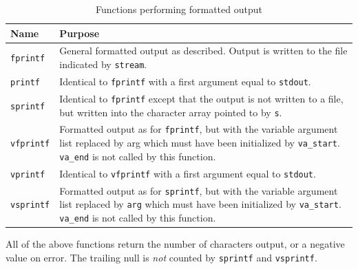 \begin{table}[htb]
  \centering
  \begin{tabular}{lp{}}%
    \toprule
    Name & Purpose    \\
    \midrule

    \texttt{fprintf} & General formatted output  as  described.
                       Output  is written to the file indicated
                       by \texttt{stream}.    \\

    \texttt{printf} & Identical  to  \texttt{fprintf}  with   a   first
                      argument equal to \texttt{stdout}.
    \\
    
    \texttt{sprintf} & Identical to  \texttt{fprintf}  except  that  the
                       output  is  not  written  to a file, but
                       written into the character array pointed
                       to by \texttt{s}.
    \\

    \texttt{vfprintf} & Formatted output  as  for  \texttt{fprintf},  but
                        with the variable argument list replaced
                        by arg which must have been  initialized
                        by  \texttt{va\_start}.
                        \texttt{va\_end}  is not called by this function.
    \\

    \texttt{vprintf} & Identical  to  \texttt{vfprintf}  with  a   first
                       argument equal to \texttt{stdout}.
    \\

    \texttt{vsprintf} & Formatted output  as  for  \texttt{sprintf},  but
                        with the variable argument list replaced
                        by \texttt{arg} which must have been  initialized
                        by  \texttt{va\_start}.
                        \texttt{va\_end}  is not called by this function.
    \\
    \bottomrule
  \end{tabular}
  \caption{\label{tab:formatOut}Functions performing formatted output}
\end{table}



   All of the above functions return the number  of  characters
    output,  or a negative value on error.  The trailing null is
    \textit{not} counted by \texttt{sprintf} and \texttt{vsprintf}.


